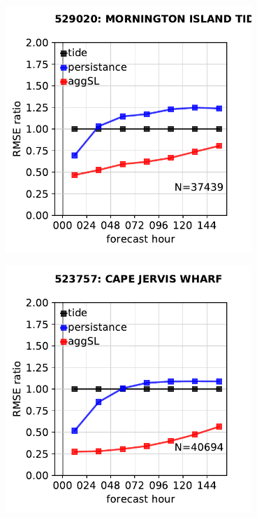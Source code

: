 \begin{frame}
\begin{columns}
\begin{column}{0.3\textwidth}
\begin{figure}
      \end{figure}
    \end{column}
    \begin{column}{0.3\textwidth}
      \begin{figure}      
        \includegraphics[width=\textwidth]{figures/plots/529020_verify_rms_growth.pdf}
      \end{figure}
      \begin{figure}      
        \includegraphics[width=\textwidth]{figures/plots/523757_verify_rms_growth.pdf}
      \end{figure}
    \end{column}
\end{columns}

\end{frame}

